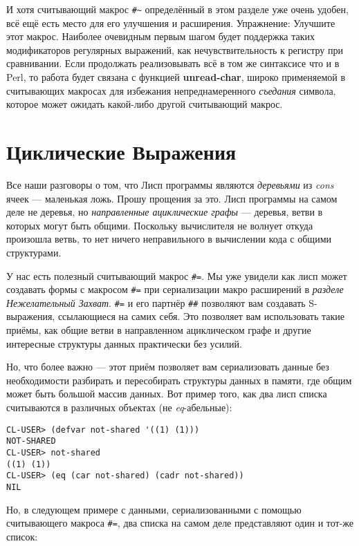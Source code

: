 И хотя считывающий макрос \verb"#~" определённый в этом разделе уже очень удобен, всё ещё есть место для его улучшения и расширения. Упражнение: Улучшите этот макрос. Наиболее очевидным первым шагом будет поддержка таких модификаторов регулярных выражений, как нечувствительность к регистру при сравнивании. Если продолжать реализовывать всё в том же синтаксисе что и в Perl, то работа будет связана с функцией \textbf{unread-char}, широко применяемой в считывающих макросах для избежания непреднамеренного \emph{съедания} символа, которое может ожидать какой-либо другой считывающий макрос.

\section{Циклические Выражения}\label{section_cyclic_expressions}

Все наши разговоры о том, что Лисп программы являются \emph{деревьями} из \emph{cons} ячеек --- маленькая ложь. Прошу прощения за это. Лисп программы на самом деле не деревья, но \emph{направленные ациклические графы} --- деревья, ветви в которых могут быть общими. Поскольку вычислителя не волнует откуда произошла ветвь, то нет ничего неправильного в вычислении кода с общими структурами.

У нас есть полезный считывающий макрос \verb"#=". Мы уже увидели как лисп может создавать формы с макросом \verb"#=" при сериализации макро расширений в \emph{разделе Нежелательный Захват}. \verb"#=" и его партнёр \verb"##" позволяют вам создавать S-выражения, ссылающиеся на самих себя. Это позволяет вам использовать такие приёмы, как общие ветви в направленном ациклическом графе и другие интересные структуры данных практически без усилий.

Но, что более важно --- этот приём позволяет вам сериализовать данные без необходимости разбирать и пересобирать структуры данных в памяти, где общим может быть большой массив данных. Вот пример того, как два лисп списка считываются в различных объектах (не \emph{eq}-а\-бель\-ные):

\begin{verbatim}
CL-USER> (defvar not-shared '((1) (1)))
NOT-SHARED
CL-USER> not-shared
((1) (1))
CL-USER> (eq (car not-shared) (cadr not-shared))
NIL
\end{verbatim}

Но, в следующем примере с данными, сериализованными с помощью считывающего макроса \verb"#=", два списка на самом деле представляют один и тот-же список:

